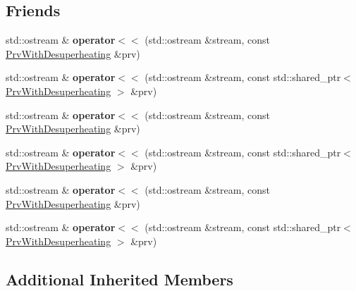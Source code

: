 \subsection*{Friends}
\begin{DoxyCompactItemize}
\item 
\mbox{\label{class_prv_with_desuperheating_ae3ed74ec57f99376d6c662690886157b}} 
std\+::ostream \& {\bfseries operator$<$$<$} (std\+::ostream \&stream, const \hyperlink{class_prv_with_desuperheating}{Prv\+With\+Desuperheating} \&prv)
\item 
\mbox{\label{class_prv_with_desuperheating_a3540803b350aad0dba7f60727946c99f}} 
std\+::ostream \& {\bfseries operator$<$$<$} (std\+::ostream \&stream, const std\+::shared\+\_\+ptr$<$ \hyperlink{class_prv_with_desuperheating}{Prv\+With\+Desuperheating} $>$ \&prv)
\item 
\mbox{\label{class_prv_with_desuperheating_ae3ed74ec57f99376d6c662690886157b}} 
std\+::ostream \& {\bfseries operator$<$$<$} (std\+::ostream \&stream, const \hyperlink{class_prv_with_desuperheating}{Prv\+With\+Desuperheating} \&prv)
\item 
\mbox{\label{class_prv_with_desuperheating_a3540803b350aad0dba7f60727946c99f}} 
std\+::ostream \& {\bfseries operator$<$$<$} (std\+::ostream \&stream, const std\+::shared\+\_\+ptr$<$ \hyperlink{class_prv_with_desuperheating}{Prv\+With\+Desuperheating} $>$ \&prv)
\item 
\mbox{\label{class_prv_with_desuperheating_ae3ed74ec57f99376d6c662690886157b}} 
std\+::ostream \& {\bfseries operator$<$$<$} (std\+::ostream \&stream, const \hyperlink{class_prv_with_desuperheating}{Prv\+With\+Desuperheating} \&prv)
\item 
\mbox{\label{class_prv_with_desuperheating_a3540803b350aad0dba7f60727946c99f}} 
std\+::ostream \& {\bfseries operator$<$$<$} (std\+::ostream \&stream, const std\+::shared\+\_\+ptr$<$ \hyperlink{class_prv_with_desuperheating}{Prv\+With\+Desuperheating} $>$ \&prv)
\end{DoxyCompactItemize}
\subsection*{Additional Inherited Members}


